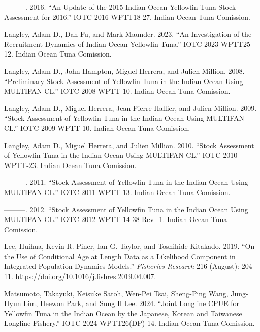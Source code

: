 \documentclass[
]{scrartcl}
\newlength{\cslhangindent}
\newenvironment{CSLReferences}[2] %
 {\begin{list}{}{%
  \setlength{\itemindent}{0pt}
  \setlength{\leftmargin}{0pt}
  \setlength{\parsep}{0pt}
  \ifodd #1
   \setlength{\leftmargin}{\cslhangindent}
   \setlength{\itemindent}{-1\cslhangindent}
  \fi
  \setlength{\itemsep}{#2\baselineskip}}}
 {\end{list}}
\begin{document}
\begin{CSLReferences}{1}{0}
---------. 2016. {``An Update of the 2015 {Indian Ocean Yellowfin Tuna}
Stock Assessment for 2016.''} IOTC-2016-WPTT18-27. Indian Ocean Tuna
Comission.

Langley, Adam D., Dan Fu, and Mark Maunder. 2023. {``An Investigation of
the Recruitment Dynamics of {Indian Ocean} Yellowfin Tuna.''}
IOTC-2023-WPTT25-12. Indian Ocean Tuna Comission.

Langley, Adam D., John Hampton, Miguel Herrera, and Julien Million.
2008. {``Preliminary Stock Assessment of Yellowfin Tuna in the {Indian
Ocean} Using {MULTIFAN-CL}.''} IOTC-2008-WPTT-10. Indian Ocean Tuna
Comission.

Langley, Adam D., Miguel Herrera, Jean-Pierre Hallier, and Julien
Million. 2009. {``Stock Assessment of Yellowfin Tuna in the {Indian
Ocean} Using {MULTIFAN-CL}.''} IOTC-2009-WPTT-10. Indian Ocean Tuna
Comission.

Langley, Adam D., Miguel Herrera, and Julien Million. 2010. {``Stock
Assessment of Yellowfin Tuna in the {Indian Ocean} Using
{MULTIFAN-CL}.''} IOTC-2010-WPTT-23. Indian Ocean Tuna Comission.

---------. 2011. {``Stock Assessment of Yellowfin Tuna in the {Indian
Ocean} Using {MULTIFAN-CL}.''} IOTC-2011-WPTT-13. Indian Ocean Tuna
Comission.

---------. 2012. {``Stock Assessment of Yellowfin Tuna in the {Indian
Ocean} Using {MULTIFAN-CL}.''} IOTC-2012-WPTT-14-38 Rev\_1. Indian Ocean
Tuna Comission.

Lee, Huihua, Kevin R. Piner, Ian G. Taylor, and Toshihide Kitakado.
2019. {``On the Use of Conditional Age at Length Data as a Likelihood
Component in Integrated Population Dynamics Models.''} \emph{Fisheries
Research} 216 (August): 204--11.
\url{https://doi.org/10.1016/j.fishres.2019.04.007}.

Matsumoto, Takayuki, Keisuke Satoh, Wen-Pei Tsai, Sheng-Ping Wang,
Jung-Hyun Lim, Heewon Park, and Sung Il Lee. 2024. {``Joint Longline
{CPUE} for Yellowfin Tuna in the {Indian Ocean} by the {Japanese},
{Korean} and {Taiwanese} Longline Fishery.''} IOTC-2024-WPTT26(DP)-14.
Indian Ocean Tuna Comission.


\end{CSLReferences}
\end{document}
